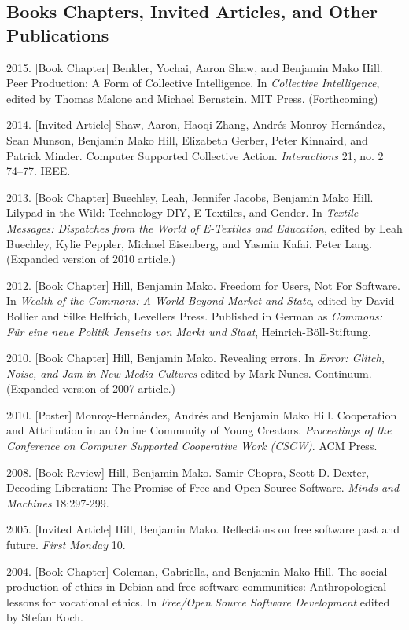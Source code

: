 \documentclass[10pt]{article}
\newenvironment{cvlist}{
\begin{list}{}{\leftmargin=3.0em \itemindent=-3.0em}
  \setlength{\itemsep}{0pt}
  \setlength{\parskip}{0em}
  \setlength{\parsep}{1em}
  \setlength{\parindent}{0em}}
{\vspace{1em}
\end{list}}
\begin{document}
\subsection{Books Chapters, Invited Articles, and Other Publications}
\begin{cvlist}
\item 2015. [Book Chapter] Benkler, Yochai, Aaron Shaw, and Benjamin Mako Hill. Peer Production: A Form of Collective Intelligence. In \emph{Collective Intelligence}, edited by Thomas Malone and Michael Bernstein. MIT Press. (Forthcoming)
\item 2014. [Invited Article] Shaw, Aaron, Haoqi Zhang, Andrés Monroy-Hernández, Sean Munson, Benjamin Mako Hill, Elizabeth Gerber, Peter Kinnaird, and Patrick Minder. Computer Supported Collective Action. \emph{Interactions} 21, no. 2 74–77. IEEE.
\item 2013. [Book Chapter] Buechley, Leah, Jennifer Jacobs, Benjamin Mako Hill. Lilypad in the Wild: Technology DIY, E-Textiles, and Gender. In \emph{Textile Messages: Dispatches from the World of E-Textiles and Education}, edited by Leah Buechley, Kylie Peppler, Michael Eisenberg, and Yasmin Kafai. Peter Lang. (Expanded version of 2010 article.)
\item 2012. [Book Chapter] Hill, Benjamin Mako. Freedom for Users, Not For Software. In \emph{Wealth of the Commons: A World Beyond Market and State}, edited by David Bollier and Silke Helfrich, Levellers Press. Published in German as \emph{Commons: Für eine neue Politik Jenseits von Markt und Staat}, Heinrich-Böll-Stiftung.
\item 2010. [Book Chapter] Hill, Benjamin Mako. Revealing errors. In \emph{Error: Glitch, Noise, and Jam in New Media Cultures} edited by Mark Nunes. Continuum. (Expanded version of 2007 article.)
\item 2010. [Poster] Monroy-Hernández, Andrés and Benjamin Mako Hill. Cooperation and Attribution in an Online Community of Young Creators. \emph{Proceedings of the Conference on Computer Supported Cooperative Work (CSCW)}. ACM Press.
\item 2008. [Book Review] Hill, Benjamin Mako. Samir Chopra, Scott D. Dexter, Decoding Liberation: The Promise of Free and Open Source Software. \emph{Minds and Machines} 18:297-299.
\item 2005. [Invited Article] Hill, Benjamin Mako. Reflections on free software past and future. \emph{First Monday} 10.
\item 2004. [Book Chapter] Coleman, Gabriella, and Benjamin Mako Hill. The social production of ethics in Debian and free software communities: Anthropological lessons for vocational ethics. In \emph{Free/Open Source Software Development} edited by Stefan Koch.
\end{cvlist}
\end{document}
